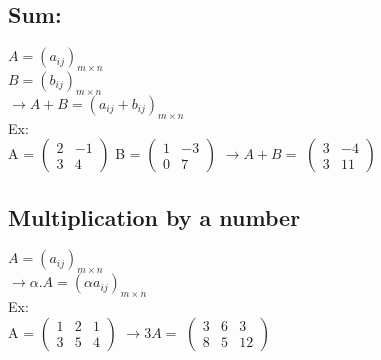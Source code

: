\documentclass[12pt]{article}
\begin{document}
\subsection{Sum:}
$A = (a_{ij})_{m \times n}$\\
$B = (b_{ij})_{m \times n}$ \\
$\rightarrow A + B = (a_{ij} + b_{ij})_{m \times n}$ \\
Ex:\\
A = 
$\begin{pmatrix}
2 & -1 \\
3 & 4
\end{pmatrix}$
\bigbreak
B = 
$\begin{pmatrix}
1 & -3 \\
0 & 7
\end{pmatrix}$
\bigbreak
$\rightarrow{A + B =}$ 
$\begin{pmatrix}
3 & -4 \\
3 & 11
\end{pmatrix}$
\subsection{Multiplication by a number}
$A = (a_{ij})_{m \times n}$ \\
$\rightarrow{ \alpha .A = (\alpha a_{ij})_{m \times n}}$ \\
Ex:\\
A = 
$\begin{pmatrix}
1 & 2 & 1 \\
3 & 5 & 4
\end{pmatrix}$
\bigbreak
$\rightarrow{3A =}$
$\begin{pmatrix}
3 & 6 & 3 \\
8 & 5 & 12 
\end{pmatrix}$
\bigbreak
\end{document}
